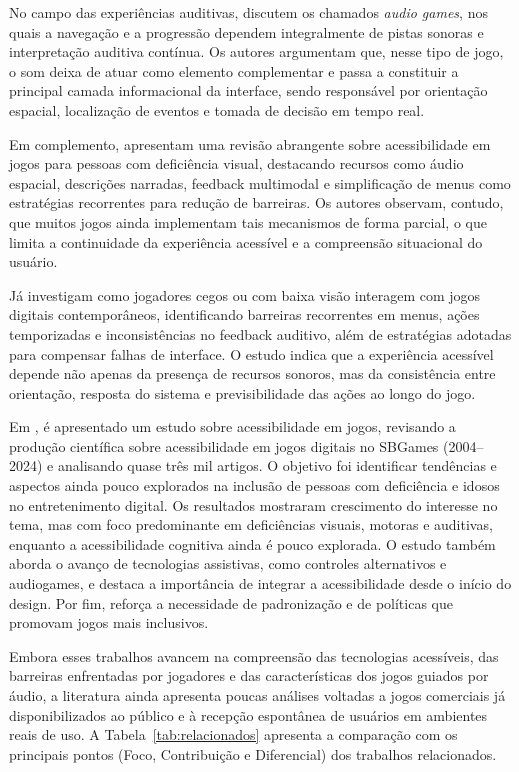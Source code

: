 \documentclass[12pt]{article}
\begin{document}
{{No campo das experiências auditivas, \cite{10.1145/1067343.1067361} discutem os chamados \textit{audio games}, nos quais a navegação e a progressão dependem integralmente de pistas sonoras e interpretação auditiva contínua. Os autores argumentam que, nesse tipo de jogo, o som deixa de atuar como elemento complementar e passa a constituir a principal camada informacional da interface, sendo responsável por orientação espacial, localização de eventos e tomada de decisão em tempo real.

Em complemento, \cite{agrimi2024game} apresentam uma revisão abrangente sobre acessibilidade em jogos para pessoas com deficiência visual, destacando recursos como áudio espacial, descrições narradas, feedback multimodal e simplificação de menus como estratégias recorrentes para redução de barreiras. Os autores observam, contudo, que muitos jogos ainda implementam tais mecanismos de forma parcial, o que limita a continuidade da experiência acessível e a compreensão situacional do usuário.

Já \cite{ran2025users} investigam como jogadores cegos ou com baixa visão interagem com jogos digitais contemporâneos, identificando barreiras recorrentes em menus, ações temporizadas e inconsistências no feedback auditivo, além de estratégias adotadas para compensar falhas de interface. O estudo indica que a experiência acessível depende não apenas da presença de recursos sonoros, mas da consistência entre orientação, resposta do sistema e previsibilidade das ações ao longo do jogo.

Em \cite{sbgames}, é apresentado um estudo sobre acessibilidade em jogos, revisando a produção científica sobre acessibilidade em jogos digitais no SBGames (2004--2024) e analisando quase três mil artigos. O objetivo foi identificar tendências e aspectos ainda pouco explorados na inclusão de pessoas com deficiência e idosos no entretenimento digital. Os resultados mostraram crescimento do interesse no tema, mas com foco predominante em deficiências visuais, motoras e auditivas, enquanto a acessibilidade cognitiva ainda é pouco explorada. O estudo também aborda o avanço de tecnologias assistivas, como controles alternativos e audiogames, e destaca a importância de integrar a acessibilidade desde o início do design. Por fim, reforça a necessidade de padronização e de políticas que promovam jogos mais inclusivos.


Embora esses trabalhos avancem na compreensão das tecnologias acessíveis, das barreiras enfrentadas por jogadores e das características dos jogos guiados por áudio, a literatura ainda apresenta poucas análises voltadas a jogos comerciais já disponibilizados ao público e à recepção espontânea de usuários em ambientes reais de uso. A Tabela~\ref{tab:relacionados} apresenta a comparação com os principais pontos (Foco, Contribuição e Diferencial) dos trabalhos relacionados.

}}
\end{document}
